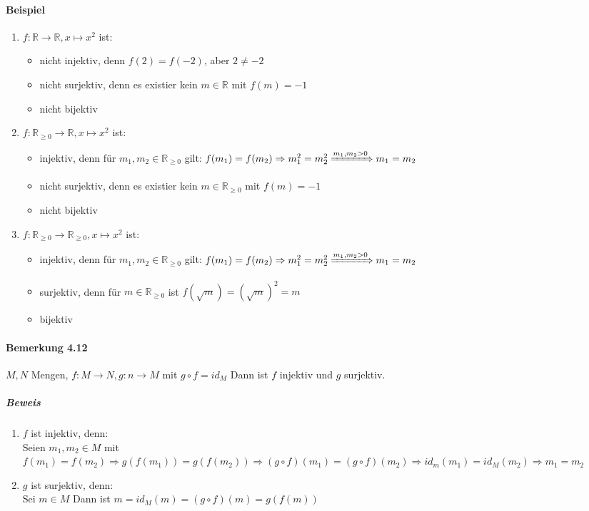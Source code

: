 \documentclass[a4paper]{scrartcl}
\begin{document}
\paragraph{Beispiel}
\label{sec-2-6-7-4}
\begin{enumerate}
\item $f:\mathbb{R}\to\mathbb{R},x\mapsto x^2$ ist:
\begin{itemize}
\item nicht injektiv, denn $f(2) = f(-2)$, aber $2\neq -2$
\item nicht surjektiv, denn es existier kein $m\in\mathbb{R}$ mit $f(m) = -1$
\item nicht bijektiv
\end{itemize}
\item $f:\mathbb{R}_{\geq 0} \to \mathbb{R}, x\mapsto x^2$ ist:
\begin{itemize}
\item injektiv, denn für $m_1,m_2 \in\mathbb{R}_{\geq 0}$ gilt: $f(m_1) = f(m_2) \Rightarrow m_1^2 = m_2^2 \xRightarrow{m_1,m_2 > 0} m_1 = m_2$
\item nicht surjektiv, denn es existier kein $m\in\mathbb{R}_{\geq 0}$ mit $f(m) = -1$
\item nicht bijektiv
\end{itemize}
\item $f:\mathbb{R}_{\geq 0} \to \mathbb{R}_{\geq 0}, x\mapsto x^2$ ist:
\begin{itemize}
\item injektiv, denn für $m_1,m_2 \in\mathbb{R}_{\geq 0}$ gilt: $f(m_1) = f(m_2) \Rightarrow m_1^2 = m_2^2 \xRightarrow{m_1,m_2 > 0} m_1 = m_2$
\item surjektiv, denn für $m\in\mathbb{R}_{\geq 0}$ ist $f(\sqrt{m}) = (\sqrt{m})^2 = m$
\item bijektiv
\end{itemize}
\end{enumerate}
\paragraph{Bemerkung 4.12}
\label{sec-2-6-7-5}
$M,N$ Mengen, $f:M\to N, g:n\to M$ mit $g\circ f = id_M$
Dann ist $f$ injektiv und $g$ surjektiv.
\subparagraph{Beweis}
\label{sec-2-6-7-5-1}
\begin{enumerate}
\item $f$ ist injektiv, denn: \\
         Seien $m_1, m_2 \in M$ mit $f(m_1) = f(m_2) \Rightarrow g(f(m_1)) = g(f(m_2)) \Rightarrow (g\circ f)(m_1) = (g\circ f)(m_2) \Rightarrow id_m(m_1) = id_M(m_2)\Rightarrow m_1 = m_2$
\item $g$ ist surjektiv, denn: \\
         Sei $m\in M$ Dann ist $m=id_M(m) = (g\circ f)(m) = g(f(m))$
\end{enumerate}
\end{document}
